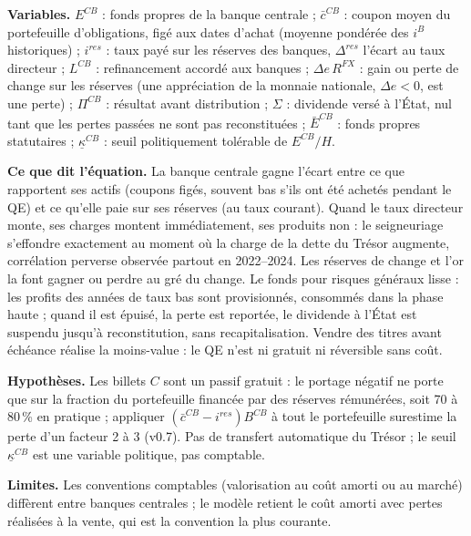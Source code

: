 \documentclass[11pt,a4paper]{article}
\newcommand{\variables}{\par\noindent\textbf{Variables.} }
\newcommand{\sens}{\par\noindent\textbf{Ce que dit l'équation.} }
\newcommand{\hyp}{\par\noindent\textbf{Hypothèses.} }
\newcommand{\limites}{\par\noindent\textbf{Limites.} }
\begin{document}
\begin{lecture}
\variables $E^{CB}$ : fonds propres de la banque centrale ; $\bar c^{CB}$ : coupon moyen du portefeuille d'obligations, figé aux dates d'achat (moyenne pondérée des $i^B$ historiques) ; $i^{res}$ : taux payé sur les réserves des banques, $\Delta^{res}$ l'écart au taux directeur ; $L^{CB}$ : refinancement accordé aux banques ; $\Delta e\,R^{FX}$ : gain ou perte de change sur les réserves (une appréciation de la monnaie nationale, $\Delta e<0$, est une perte) ; $\Pi^{CB}$ : résultat avant distribution ; $\Sigma$ : dividende versé à l'État, nul tant que les pertes passées ne sont pas reconstituées ; $\bar E^{CB}$ : fonds propres statutaires ; $\underline\kappa^{CB}$ : seuil politiquement tolérable de $E^{CB}/H$.
\sens La banque centrale gagne l'écart entre ce que rapportent ses actifs (coupons figés, souvent bas s'ils ont été achetés pendant le QE) et ce qu'elle paie sur ses réserves (au taux courant). Quand le taux directeur monte, ses charges montent immédiatement, ses produits non : le seigneuriage s'effondre exactement au moment où la charge de la dette du Trésor augmente, corrélation perverse observée partout en 2022--2024. Les réserves de change et l'or la font gagner ou perdre au gré du change. Le fonds pour risques généraux lisse : les profits des années de taux bas sont provisionnés, consommés dans la phase haute ; quand il est épuisé, la perte est reportée, le dividende à l'État est suspendu jusqu'à reconstitution, sans recapitalisation. Vendre des titres avant échéance réalise la moins-value : le QE n'est ni gratuit ni réversible sans coût.
\hyp Les billets $C$ sont un passif gratuit : le portage négatif ne porte que sur la fraction du portefeuille financée par des réserves rémunérées, soit 70 à 80\,\% en pratique ; appliquer $(\bar c^{CB}-i^{res})B^{CB}$ à tout le portefeuille surestime la perte d'un facteur 2 à 3 (v0.7). Pas de transfert automatique du Trésor ; le seuil $\underline\kappa^{CB}$ est une variable politique, pas comptable.
\limites Les conventions comptables (valorisation au coût amorti ou au marché) diffèrent entre banques centrales ; le modèle retient le coût amorti avec pertes réalisées à la vente, qui est la convention la plus courante.

\end{lecture}
\end{document}
